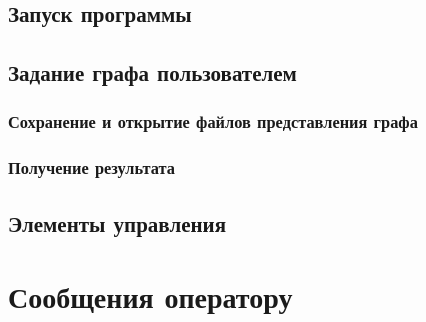 \documentclass[a4paper,12pt]{article}
\begin{document}
    \subsection{Запуск программы}

    \subsection{Задание графа пользователем}

    \subsubsection{Сохранение и открытие файлов представления графа}

    \subsubsection{Получение результата}

    \subsection{Элементы управления}

    \newpage


    \section{Сообщения оператору}

    \newpage
    \listRegistration
\end{document}
